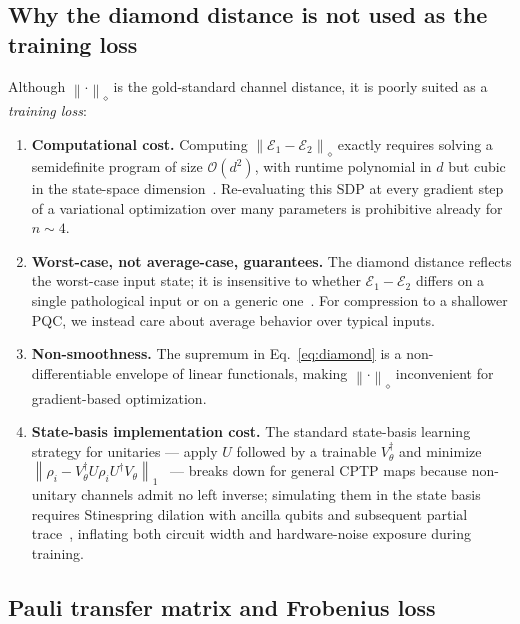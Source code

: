 \documentclass[%
 reprint,
superscriptaddress,
 amsmath,amssymb,
 aps,
]{revtex4-2}
\newcommand{\E}{\mathcal{E}}
\newcommand{\norm}[1]{\left\lVert#1\right\rVert}
\begin{document}
\subsection{Why the diamond distance is not used as the training loss}

Although $\norm{\cdot}_\diamond$ is the gold-standard channel distance, it is poorly suited as a \emph{training loss}:
\begin{enumerate}
    \item \textbf{Computational cost.} Computing $\norm{\E_1-\E_2}_\diamond$ exactly requires solving a semidefinite program of size $\mathcal{O}(d^2)$, with runtime polynomial in $d$ but cubic in the state-space dimension~\cite{watrous2009sdp}. Re-evaluating this SDP at every gradient step of a variational optimization over many parameters is prohibitive already for $n\sim 4$.
    \item \textbf{Worst-case, not average-case, guarantees.} The diamond distance reflects the worst-case input state; it is insensitive to whether $\E_1-\E_2$ differs on a single pathological input or on a generic one~\cite{gilchrist2005distance,magesan2012characterizing}. For compression to a shallower PQC, we instead care about average behavior over typical inputs.
    \item \textbf{Non-smoothness.} The supremum in Eq.~\eqref{eq:diamond} is a non-differentiable envelope of linear functionals, making $\norm{\cdot}_\diamond$ inconvenient for gradient-based optimization.
    \item \textbf{State-basis implementation cost.} The standard state-basis learning strategy for unitaries --- apply $U$ followed by a trainable $V_\theta^\dagger$ and minimize $\norm{\rho_i - V_\theta^\dagger U\rho_i U^\dagger V_\theta}_1$~\cite{khatri2019qaqc,sharma2020noiseresilience} --- breaks down for general CPTP maps because non-unitary channels admit no left inverse; simulating them in the state basis requires Stinespring dilation with ancilla qubits and subsequent partial trace~\cite{nielsen2010quantum}, inflating both circuit width and hardware-noise exposure during training.
\end{enumerate}

\subsection{Pauli transfer matrix and Frobenius loss}
\label{sec:PTM_and_Frobenius}
\end{document}
